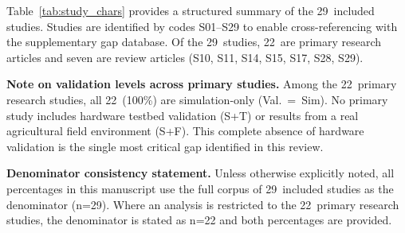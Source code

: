\documentclass[review,3p]{elsarticle}
\begin{document}
Table~\ref{tab:study_chars} provides a structured summary of the 29~included
studies. Studies are identified by codes S01--S29 to enable cross-referencing
with the supplementary gap database. Of the 29~studies, 22~are primary research
articles and seven are review articles (S10, S11, S14, S15, S17, S28, S29).

\textbf{Note on validation levels across primary studies.} Among the
22~primary research studies, all 22~(100\%) are simulation-only
(Val.~=~Sim). No primary study includes hardware testbed validation (S+T)
or results from a real agricultural field environment (S+F). This
complete absence of hardware validation is the single most critical gap
identified in this review.

\textbf{Denominator consistency statement.} Unless otherwise explicitly noted,
all percentages in this manuscript use the full corpus of 29~included studies
as the denominator (n=29). Where an analysis is restricted to the 22~primary
research studies, the denominator is stated as n=22 and both percentages are
provided.
\end{document}
